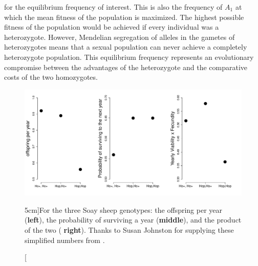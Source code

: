 for the equilibrium frequency of interest. This is also the frequency
of $A_1$ at which the mean fitness of the population is maximized. The
highest possible fitness of the population would be achieved if every
individual was a heterozygote. However, Mendelian segregation of alleles in the
gametes of heterozygotes means that a sexual population can never
achieve a completely heterozygote population. This equilibrium
frequency represents an evolutionary compromise between the advantages
of the heterozygote and the comparative costs of the two
homozygotes.\\



\begin{figure}
\begin{center}
  \includegraphics[width = \textwidth]{Rcode/Soay_Sheep/Hopping_sheep_all.pdf}
\end{center}
\caption[][5cm]{For the three Soay sheep genotypes: the offspring per year  ({\bf left}), the probability of
  surviving a year ({\bf middle}), and the product of the two ({\bf
    right}). Thanks to Susan Johnston for supplying these simplified
  numbers from \citet{johnston2013life}. 
} \label{fig:Soay_fitness}
\end{figure}



